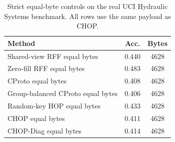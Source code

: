 \begin{table}[t]
\centering
\caption{Strict equal-byte controls on the real UCI Hydraulic Systems benchmark. All rows use the same payload as CHOP.}
\label{tab:strict-equal-byte-hydraulic}
\begin{tabular}{lcc}
\toprule
Method & Acc. & Bytes \\
\midrule
Shared-view RFF equal bytes & 0.440 & 4628 \\
Zero-fill RFF equal bytes & 0.483 & 4628 \\
CProto equal bytes & 0.408 & 4628 \\
Group-balanced CProto equal bytes & 0.406 & 4628 \\
Random-key HOP equal bytes & 0.433 & 4628 \\
CHOP equal bytes & 0.411 & 4628 \\
CHOP-Diag equal bytes & 0.414 & 4628 \\
\bottomrule
\end{tabular}
\end{table}
